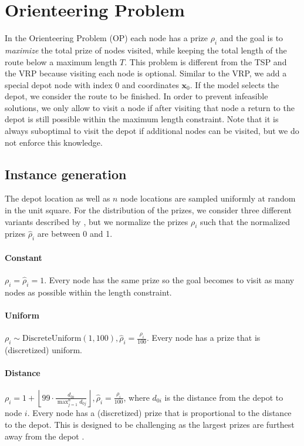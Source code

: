 \section{Orienteering Problem}
\label{sec:appendix_orienteering}
In the Orienteering Problem (OP) each node has a prize $\rho_i$ and the goal is to \emph{maximize} the total prize of nodes visited, while keeping the total length of the route below a maximum length $T$. This problem is different from the TSP and the VRP because visiting each node is optional. Similar to the VRP, we add a special depot node with index 0 and coordinates $\mathbf{x}_0$. If the model selects the depot, we consider the route to be finished. In order to prevent infeasible solutions, we only allow to visit a node if after visiting that node a return to the depot is still possible within the maximum length constraint. Note that it is always suboptimal to visit the depot if additional nodes can be visited, but we do not enforce this knowledge.

\subsection{Instance generation}
The depot location as well as $n$ node locations are sampled uniformly at random in the unit square. For the distribution of the prizes, we consider three different variants described by \citet{fischetti1998solving}, but we normalize the prizes $\rho_i$ such that the normalized prizes $\hat{\rho}_i$ are between 0 and 1.

\paragraph{Constant}
$\rho_i = \hat{\rho}_i = 1$. Every node has the same prize so the goal becomes to visit as many nodes as possible within the length constraint.

\paragraph{Uniform}
$\rho_i \sim \text{DiscreteUniform}(1, 100), \hat{\rho}_i = \frac{\rho_i}{100}$. Every node has a prize that is (discretized) uniform.

\paragraph{Distance}
$\rho_i = 1 + \left \lfloor{99 \cdot \frac{d_{0i}}{\max_{j=1}^n d_{0j}}}\right \rfloor, \hat{\rho}_i = \frac{\rho_i}{100}$, where $d_{0i}$ is the distance from the depot to node $i$. Every node has a (discretized) prize that is proportional to the distance to the depot. This is designed to be challenging as the largest prizes are furthest away from the depot \citep{fischetti1998solving}.

